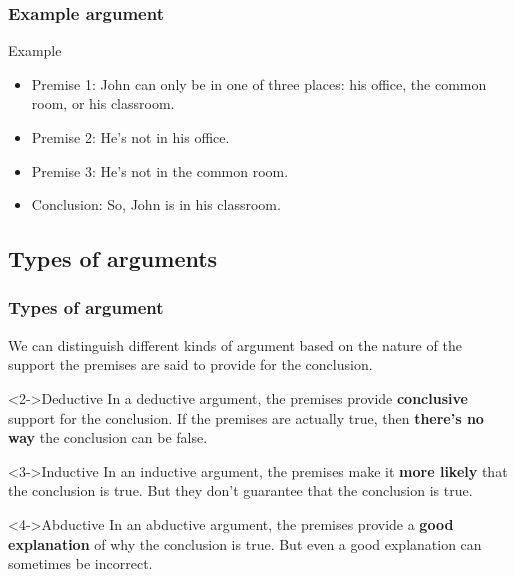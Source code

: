 \begin{frame}
\frametitle{Example argument}

\begin{block}{Example}
  \begin{itemize}
    \item Premise 1: John can only be in one of three places: his office, the common room, or his classroom.
    \item Premise 2: He's not in his office.
    \item Premise 3: He's not in the common room.
    \item Conclusion: So, John is in his classroom.
  \end{itemize}
\end{block}


\end{frame}

\subsection{Types of arguments}

\begin{frame}
\frametitle{Types of argument}

We can distinguish different kinds of argument based on the nature of the support the premises are said to provide for the conclusion.

\begin{block}<2->{Deductive}
  In a deductive argument, the premises provide \textbf{conclusive} support for the conclusion.  If the premises are actually true, then \textbf{there's no way} the conclusion can be false.
\end{block}

\begin{block}<3->{Inductive}
  In an inductive argument, the premises make it \textbf{more likely} that the conclusion is true.  But they don't guarantee that the conclusion is true.
\end{block}

\begin{block}<4->{Abductive}
  In an abductive argument, the premises provide a \textbf{good explanation} of why the conclusion is true. But even a good explanation can sometimes be incorrect.
\end{block}

\end{frame}

